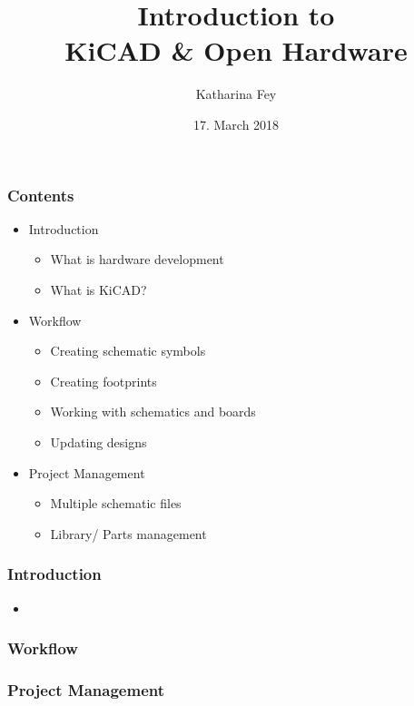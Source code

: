 \documentclass{beamer}
\begin{document}
\title{Introduction to\\KiCAD \& Open Hardware}   
\author{Katharina Fey} 
\date{17. March 2018} 

\frame{\titlepage} 


\begin{frame}
  \frametitle{Contents}
  \begin{itemize}
    \item Introduction
    \begin{itemize}
      \item What is hardware development
      \item What is KiCAD?
    \end{itemize}
    \item Workflow
    \begin{itemize}
      \item Creating schematic symbols
      \item Creating footprints
      \item Working with schematics and boards
      \item Updating designs
    \end{itemize}
    \item Project Management
    \begin{itemize}
      \item Multiple schematic files
      \item Library/ Parts management
    \end{itemize}
  \end{itemize}
\end{frame}


\begin{frame}
  \frametitle{Introduction}
  \begin{itemize}
    \item 
  \end{itemize}
\end{frame}


\begin{frame}
  \frametitle{Workflow}
\end{frame}


\begin{frame}
  \frametitle{Project Management}
\end{frame}
\end{document}
